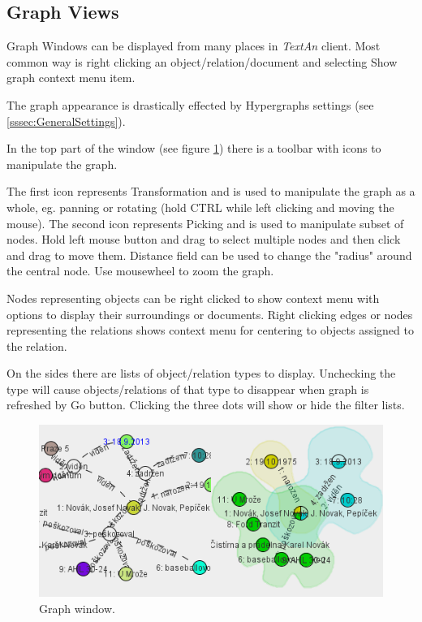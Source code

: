 \documentclass[12pt,a4paper]{report}
\newcommand{\textan}{\emph{TextAn}}
\begin{document}
\subsection{Graph Views}
\label{ssec:Graphs}

Graph Windows can be displayed from many places in \textan{} client. Most
common way is right clicking an object/relation/document and selecting Show
graph context menu item.

The graph appearance is drastically effected by Hypergraphs settings (see
\ref{sssec:GeneralSettings}).

In the top part of the window (see figure \ref{fig:Graph}) there is a toolbar
with icons to manipulate the graph.

The first icon represents Transformation and is used to manipulate the graph as a whole, eg. panning or rotating (hold CTRL while left clicking and moving the
mouse). The second icon represents Picking and is used to manipulate subset of nodes. Hold left mouse button and drag to select multiple nodes and then click and drag to move them. Distance field can be used to change the "radius" around the central node. Use mousewheel to zoom the graph.

Nodes representing objects can be right clicked to show context menu with
options to display their surroundings or documents. Right clicking edges or
nodes representing the relations shows context menu for centering to objects
assigned to the relation.

On the sides there are lists of object/relation types to display. Unchecking
the type will cause objects/relations of that type to disappear when graph is refreshed by Go button. Clicking the three dots will show or hide the filter
lists.

\begin{figure}[!htb]
        \centering
        \includegraphics[width=\textwidth]{Images/graph}
        \caption{Graph window.}
        \label{fig:Graph}
\end{figure}
\end{document}
